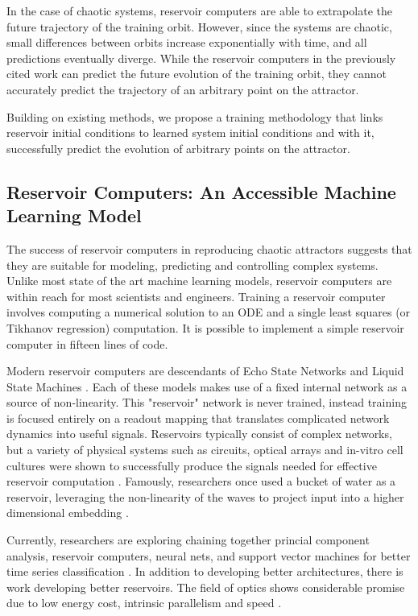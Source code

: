\documentclass[journal]{journal}
\begin{document}
In the case of chaotic systems, reservoir computers are able to extrapolate the future trajectory of the training orbit. However, since the systems are chaotic, small differences between orbits increase exponentially with time, and all predictions eventually diverge. While the  reservoir computers in the previously cited work can predict the future evolution of the training orbit, they cannot accurately predict the trajectory of an arbitrary point on the attractor. 

Building on existing methods, we propose a training methodology that links reservoir initial conditions to learned system initial conditions and with it, successfully predict the evolution of arbitrary points on the attractor.

\subsection{Reservoir Computers: An Accessible Machine Learning Model}
 
The success of reservoir computers in reproducing chaotic attractors suggests that they are suitable for modeling, predicting and controlling complex systems. Unlike most state of the art machine learning models, reservoir computers are within reach for most scientists and engineers. Training a reservoir computer involves computing a numerical solution to an ODE and a single least squares (or Tikhanov regression) computation. It is possible to implement a simple reservoir computer in fifteen lines of code.

Modern reservoir computers are descendants of Echo State Networks and Liquid State Machines \cite{Jaeger2001, Maass2002}. Each of these models makes use of a fixed internal network as a source of non-linearity. This "reservoir" network is never trained, instead training is focused entirely on a readout mapping that translates complicated network dynamics into useful signals. Reservoirs typically consist of complex networks, but a variety of physical systems such as circuits, optical arrays and in-vitro cell cultures were shown to successfully produce the signals needed for effective reservoir computation \cite{Tanaka2019}. Famously, researchers once used a bucket of water as a reservoir, leveraging the non-linearity of the waves to project input into a higher dimensional embedding \cite{Fernando2003}. 

Currently, researchers are exploring chaining together princial component analysis, reservoir computers, neural nets,  and support vector machines for better time series classification \cite{Bianchi2020}. In addition to developing better architectures, there is work developing better reservoirs. The field of optics shows considerable promise due to low energy cost, intrinsic parallelism and speed \cite{Rafayelyan2020}.
\end{document}
